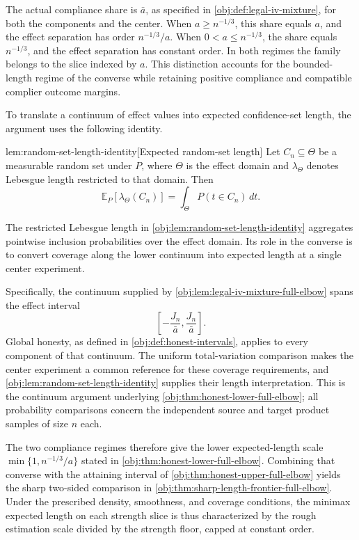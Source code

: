 The actual compliance share is \(\bar a\), as specified in \cref{obj:def:legal-iv-mixture}, for both the components and the center. When \(a\ge n^{-1/3}\), this share equals \(a\), and the effect separation has order \(n^{-1/3}/a\). When \(0<a\le n^{-1/3}\), the share equals \(n^{-1/3}\), and the effect separation has constant order. In both regimes the family belongs to the slice indexed by \(a\). This distinction accounts for the bounded-length regime of the converse while retaining positive compliance and compatible complier outcome margins.

To translate a continuum of effect values into expected confidence-set length, the argument uses the following identity.

\begin{lemmav}{lem:random-set-length-identity}[Expected random-set length]
Let \(C_n\subseteq\Theta\) be a measurable random set under \(P\), where \(\Theta\) is the effect domain and \(\lambda_{\Theta}\) denotes Lebesgue length restricted to that domain. Then
\[
\mathbb E_P\!\left[\lambda_{\Theta}(C_n)\right]
=
\int_{\Theta}P(t\in C_n)\,dt.
\]
\end{lemmav}

The restricted Lebesgue length  in \cref{obj:lem:random-set-length-identity} aggregates pointwise inclusion probabilities over the effect domain. Its role in the converse is to convert coverage along the lower continuum into expected length at a single center experiment.

Specifically, the continuum supplied by \cref{obj:lem:legal-iv-mixture-full-elbow} spans the effect interval
\[
\left[-\frac{J_n}{\bar a},\frac{J_n}{\bar a}\right].
\]
Global honesty, as defined in \cref{obj:def:honest-intervals}, applies to every component of that continuum. The uniform total-variation comparison makes the center experiment a common reference for these coverage requirements, and \cref{obj:lem:random-set-length-identity} supplies their length interpretation. This is the continuum argument underlying \cref{obj:thm:honest-lower-full-elbow}; all probability comparisons concern the independent source and target product samples of size \(n\) each.

The two compliance regimes therefore give the lower expected-length scale \(\min\{1,n^{-1/3}/a\}\) stated in \cref{obj:thm:honest-lower-full-elbow}. Combining that converse with the attaining interval of \cref{obj:thm:honest-upper-full-elbow} yields the sharp two-sided comparison in \cref{obj:thm:sharp-length-frontier-full-elbow}. Under the prescribed density, smoothness, and coverage conditions, the minimax expected length on each strength slice is thus characterized by the rough estimation scale divided by the strength floor, capped at constant order.
